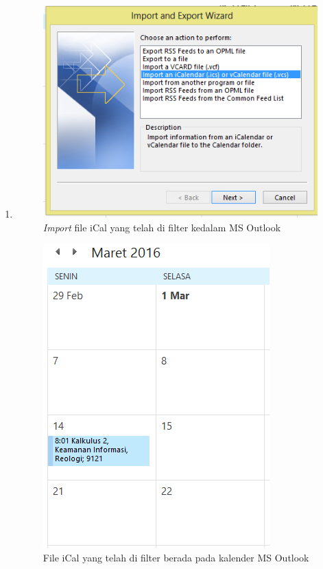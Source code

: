 \begin{enumerate}
		\item 
			\begin{figure}[H]
			\centering
			\includegraphics[scale=0.8]{Gambar/importOutlook}
			\caption{\textit{Import} file iCal yang telah di filter kedalam MS Outlook }
			\label{fig:importOutlookFilter}
			\end{figure}
		
			\begin{figure}[H]
			\centering
			\includegraphics[scale=0.8]{Gambar/hasilOutlook2}
			\caption{File iCal yang telah di filter berada pada kalender MS Outlook }
			\label{fig:hasilOutlookFilter2}
			\end{figure}
			

\end{enumerate}
